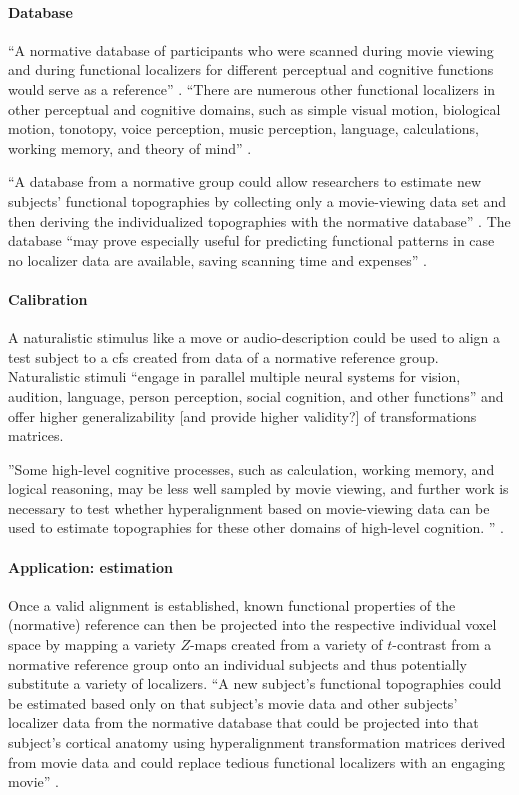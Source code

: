 \paragraph{Database}

%
``A normative database of participants who were scanned during movie viewing and
during functional localizers for different perceptual and cognitive functions
would serve as a reference'' \citep{jiahui2020predicting}.
%
``There are numerous other functional localizers in other perceptual and
cognitive domains, such as simple visual motion, biological motion, tonotopy,
voice perception, music perception, language, calculations, working memory, and
theory of mind'' \citep{jiahui2020predicting}.

%
``A database from a normative group could allow researchers to estimate new
subjects' functional topographies by collecting only a movie-viewing data set
and then deriving the individualized topographies with the normative database''
\citep{jiahui2020predicting}.
%
The database ``may prove especially useful for predicting functional patterns in
case no localizer data are available, saving scanning time and expenses''
\citep{rosenke2021probabilistic}.


\paragraph{Calibration}
%
A naturalistic stimulus like a move or audio-description could be used to align
a test subject to a \ac{cfs} created from data of a normative reference group.
%
Naturalistic stimuli ``engage in parallel multiple neural systems for vision,
audition, language, person perception, social cognition, and other functions''
\citep{jiahui2020predicting} and offer higher generalizability [and provide
higher validity?] of transformations matrices.

%
''Some high-level cognitive processes, such as calculation, working memory, and
logical reasoning, may be less well sampled by movie viewing, and further work
is necessary to test whether hyperalignment based on movie-viewing data can be
used to estimate topographies for these other domains of high-level cognition.
'' \citep{jiahui2020predicting}.


\paragraph{Application: estimation}

%
Once a valid alignment is established, known functional properties of the
(normative) reference can then be projected into the respective individual voxel
space by mapping a variety $Z$-maps created from a variety of $t$-contrast from
a normative reference group onto an individual subjects and thus potentially
substitute a variety of localizers.
%
``A new subject's functional topographies could be estimated based only on that
subject's movie data and other subjects' localizer data from the normative
database that could be projected into that subject's cortical anatomy using
hyperalignment transformation matrices derived from movie data and could replace
tedious functional localizers with an engaging movie''
\citep{jiahui2020predicting}.

